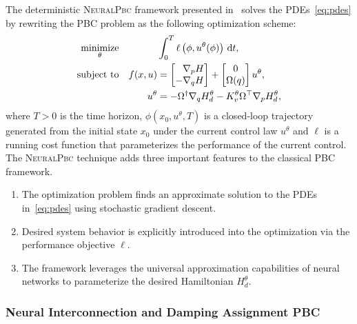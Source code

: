 The deterministic \textsc{NeuralPbc} framework presented in~\cite{neuralpbc}
solves the PDEs~\eqref{eq:pdes} by rewriting the PBC problem as the following 
optimization scheme:
\begin{equation}
  \begin{aligned}
      \underset{\theta}{\textrm{minimize}} 
      & & &\int_{0}^{T} \ell \left(\phi,u^{\theta}(\phi) \right) \, \dd t , \\%
      \textrm{subject to}
      & & f(x, u) &= \bmat{\phantom{-}\nabla_p H \\ -\nabla_q H} + \bmat{0 \\ \Omega(q)}u^{\theta}, \\%
      & & u^{\theta} &= -\Omega^{\dagger} \nabla_q H_d^{\theta} - K_v^{\theta} \Omega^\top \nabla_p H_d^{\theta},%
  \end{aligned}
  \label{eq:neural_pbc_finite_optim}
\end{equation}
where $T>0$ is the time horizon, $\phi( x_0, u^\theta, T)$ is a closed-loop
trajectory generated from the initial state $x_0$ under the current control law
$u^\theta$ and $\ell$ is a running cost function that parameterizes the
performance of the current control.
%
The \textsc{NeuralPbc} technique adds three important features to the classical 
PBC framework.
\begin{enumerate}
  \item The optimization problem finds an approximate solution to the PDEs
  in~\eqref{eq:pdes} using stochastic gradient descent.
  \item Desired system behavior is explicitly introduced into the optimization
  via the performance objective $\ell$.
  \item The framework leverages the universal approximation capabilities of
  neural networks to parameterize the desired Hamiltonian $H^\theta_d$.
\end{enumerate}

\subsubsection{Neural Interconnection and Damping Assignment PBC}


